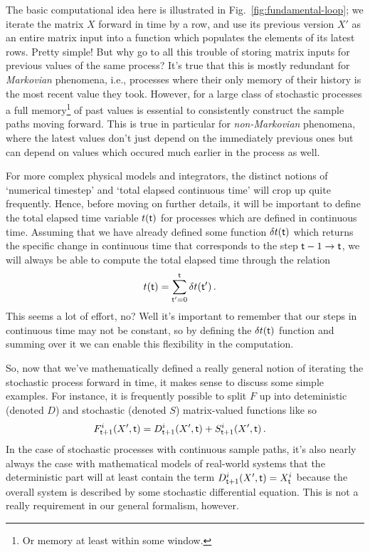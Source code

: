 \documentclass{book}
\begin{document}
The basic computational idea here is illustrated in Fig.~\ref{fig:fundamental-loop}; we iterate the matrix $X$ forward in time by a row, and use its previous version $X'$ as an entire matrix input into a function which populates the elements of its latest rows. Pretty simple! But why go to all this trouble of storing matrix inputs for previous values of the same process? It's true that this is mostly redundant for \emph{Markovian} phenomena, i.e., processes where their only memory of their history is the most recent value they took. However, for a large class of stochastic processes a full memory\footnote{Or memory at least within some window.} of past values is essential to consistently construct the sample paths moving forward. This is true in particular for \emph{non-Markovian} phenomena, where the latest values don't just depend on the immediately previous ones but can depend on values which occured much earlier in the process as well.

For more complex physical models and integrators, the distinct notions of `numerical timestep' and `total elapsed continuous time' will crop up quite frequently. Hence, before moving on further details, it will be important to define the total elapsed time variable $t({\sf t})$ for processes which are defined in continuous time. Assuming that we have already defined some function $\delta t({\sf t})$ which returns the specific change in continuous time that corresponds to the step ${\sf t}-1 \rightarrow {\sf t}$, we will always be able to compute the total elapsed time through the relation
\begin{align}
t({\sf t}) &= \sum^{{\sf t}}_{{\sf t}'=0}\delta t({\sf t}') \label{eq:t-steps-sum} \,.
\end{align}
This seems a lot of effort, no? Well it's important to remember that our steps in continuous time may not be constant, so by defining the $\delta t({\sf t})$ function and summing over it we can enable this flexibility in the computation.

So, now that we've mathematically defined a really general notion of iterating the stochastic process forward in time, it makes sense to discuss some simple examples. For instance, it is frequently possible to split $F$ up into deteministic (denoted $D$) and stochastic (denoted $S$) matrix-valued functions like so
\begin{align}
& F^{i}_{{\sf t}+1}(X',{\sf t}) = D^{i}_{{\sf t}+1}(X',{\sf t}) + S^{i}_{{\sf t}+1}(X',{\sf t}) \,.
\end{align}
In the case of stochastic processes with continuous sample paths, it's also nearly always the case with mathematical models of real-world systems that the deterministic part will at least contain the term $D^{i}_{{\sf t}+1}(X',{\sf t}) = X^i_{\sf t}$ because the overall system is described by some stochastic differential equation. This is not a really requirement in our general formalism, however.
\end{document}
